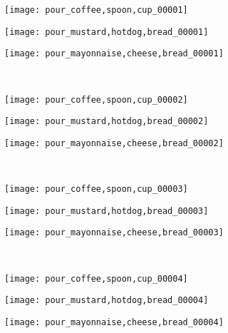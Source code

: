 \documentclass{bmvc2k}
\begin{document}
\begin{figure}[h]
	\centering      
	\begin{subfigure}[b]{0.32\textwidth}
		\texttt{[image: pour\_coffee,spoon,cup\_00001]}
	\end{subfigure}
	\begin{subfigure}[b]{0.32\textwidth}
		\texttt{[image: pour\_mustard,hotdog,bread\_00001]}
	\end{subfigure}
	\begin{subfigure}[b]{0.32\textwidth}
		\texttt{[image: pour\_mayonnaise,cheese,bread\_00001]}
	\end{subfigure}\\
	\vskip 2mm
	\begin{subfigure}[b]{0.32\textwidth}
		\texttt{[image: pour\_coffee,spoon,cup\_00002]}
	\end{subfigure}
	\begin{subfigure}[b]{0.32\textwidth}
		\texttt{[image: pour\_mustard,hotdog,bread\_00002]}
	\end{subfigure}
	\begin{subfigure}[b]{0.32\textwidth}
		\texttt{[image: pour\_mayonnaise,cheese,bread\_00002]}
	\end{subfigure}\\
	\vskip 2mm
	\begin{subfigure}[b]{0.32\textwidth}
		\texttt{[image: pour\_coffee,spoon,cup\_00003]}
	\end{subfigure}
	\begin{subfigure}[b]{0.32\textwidth}
		\texttt{[image: pour\_mustard,hotdog,bread\_00003]}
	\end{subfigure}
	\begin{subfigure}[b]{0.32\textwidth}
		\texttt{[image: pour\_mayonnaise,cheese,bread\_00003]}
	\end{subfigure}\\
	\vskip 2mm
	\begin{subfigure}[b]{0.32\textwidth}
		\texttt{[image: pour\_coffee,spoon,cup\_00004]}
	\end{subfigure}
	\begin{subfigure}[b]{0.32\textwidth}
		\texttt{[image: pour\_mustard,hotdog,bread\_00004]}
	\end{subfigure}
	\begin{subfigure}[b]{0.32\textwidth}
		\texttt{[image: pour\_mayonnaise,cheese,bread\_00004]}
	\end{subfigure}\\

\end{figure}
\end{document}

